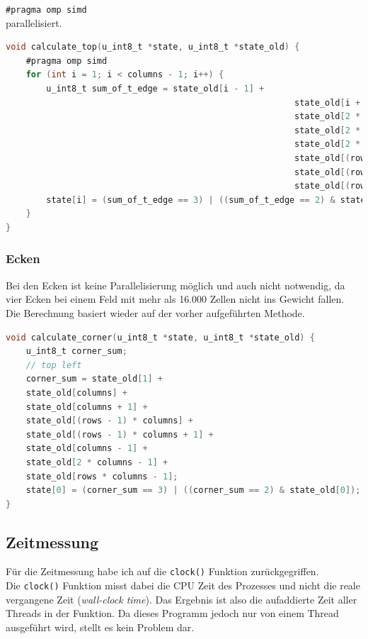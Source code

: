 \documentclass[german,plainarticle,hyperref,utf8]{zihpub}
\begin{document}
	\texttt{\#pragma omp simd}\\
	
	parallelisiert.	
	\begin{lstlisting}[language=C, caption=Berechnung der obersten Zeile]
void calculate_top(u_int8_t *state, u_int8_t *state_old) {
	#pragma omp simd
	for (int i = 1; i < columns - 1; i++) {
		u_int8_t sum_of_t_edge = state_old[i - 1] +
														 state_old[i + 1] +
														 state_old[2 * columns + (i - 1)] +
														 state_old[2 * columns + i] +
														 state_old[2 * columns + (i + 1)] +
														 state_old[(rows - 1) * columns + i] +
														 state_old[(rows - 1) * columns + i + 1] +
														 state_old[(rows - 1) * columns + i - 1];
		state[i] = (sum_of_t_edge == 3) | ((sum_of_t_edge == 2) & state_old[i]);
	}
}\end{lstlisting}

	\subsubsection{Ecken}
	Bei den Ecken ist keine Parallelisierung möglich und auch nicht notwendig, da vier Ecken bei einem Feld mit mehr als 16.000 Zellen nicht ins Gewicht fallen.\\
	Die Berechnung basiert wieder auf der vorher aufgeführten Methode.\\
	
	\begin{lstlisting}[language=C, caption=Berechnung der Ecke oben links]
void calculate_corner(u_int8_t *state, u_int8_t *state_old) {
	u_int8_t corner_sum;
	// top left
	corner_sum = state_old[1] +
	state_old[columns] +
	state_old[columns + 1] +
	state_old[(rows - 1) * columns] +
	state_old[(rows - 1) * columns + 1] +
	state_old[columns - 1] +
	state_old[2 * columns - 1] +
	state_old[rows * columns - 1];
	state[0] = (corner_sum == 3) | ((corner_sum == 2) & state_old[0]);
}\end{lstlisting}
	
	\subsection{Zeitmessung}
	
	Für die Zeitmessung habe ich auf die \texttt{clock()} Funktion zurückgegriffen.\\
	
	Die \texttt{clock()} Funktion misst dabei die CPU Zeit des Prozesses und nicht die reale vergangene Zeit (\textit{wall-clock time}). Das Ergebnis ist also die aufaddierte Zeit aller Threads in der Funktion. Da dieses Programm jedoch nur von einem Thread ausgeführt wird, stellt es kein Problem dar.\\
	
\end{document}
